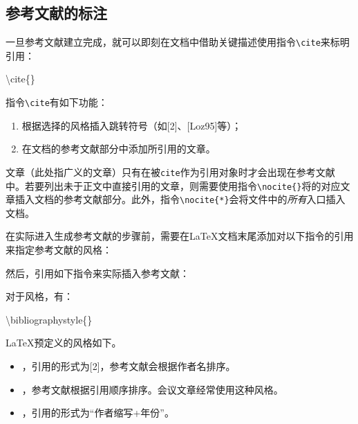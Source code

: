\subsection{参考文献的标注}

一旦参考文献建立完成，就可以即刻在文档中借助关键描述使用指令\verb|\cite|来标明引用：

\begin{dmd}
\backslash cite\{\}
\end{dmd}

指令\verb|\cite|有如下功能：

\begin{enumerate}
    \item 根据选择的风格插入跳转符号（如[2]、[Loz95]等）；
    \item 在文档的参考文献部分中添加所引用的文章。
\end{enumerate}

\begin{ii}
    文章（此处指广义的文章）只有在被\verb|cite|作为引用对象时才会出现在参考文献中。若要列出未于正文中直接引用的文章，则需要使用指令\verb|\nocite{|\verb|}|将的对应文章插入文档的参考文献部分。此外，指令\verb|\nocite{*}|会将文件中的\emph{所有}入口插入文档。
\end{ii}

在实际进入生成参考文献的步骤前，需要在\LaTeX 文档末尾添加对以下指令的引用来指定参考文献的风格：

\begin{dmd}
\verb||
\end{dmd}

然后，引用如下指令来实际插入参考文献：

\begin{dmd}
\verb||
\end{dmd}

对于风格，有：

\begin{dmd}
\backslash bibliographystyle\{\}
\end{dmd}

\LaTeX 预定义的风格如下。

\begin{itemize}
    \item {}，引用的形式为[2]，参考文献会根据作者名排序。
    \item {}，参考文献根据引用顺序排序。会议文章经常使用这种风格。
    \item {}，引用的形式为“作者缩写+年份”。
\end{itemize}

